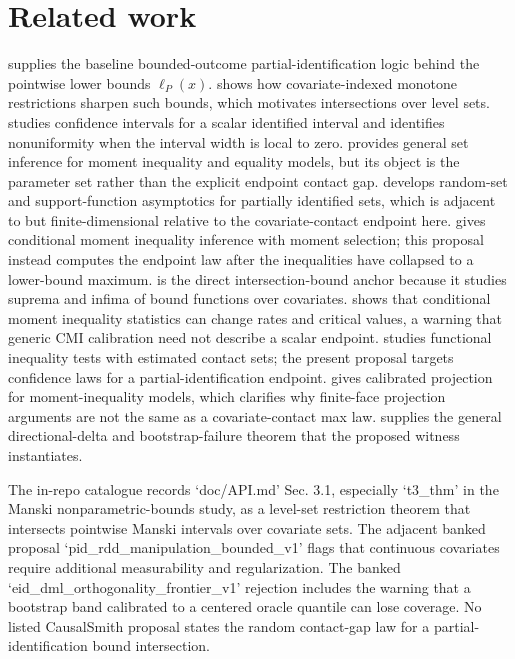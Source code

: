 \documentclass[11pt]{article}
\theoremstyle{definition}
\theoremstyle{plain}
\theoremstyle{remark}
\begin{document}
\section{Related work}
\citet{Manski1990} supplies the baseline bounded-outcome partial-identification logic behind the pointwise lower bounds \(\ell_P(x)\). \citet{ManskiPepper2000} shows how covariate-indexed monotone restrictions sharpen such bounds, which motivates intersections over level sets. \citet{ImbensManski2004} studies confidence intervals for a scalar identified interval and identifies nonuniformity when the interval width is local to zero. \citet{ChernozhukovHongTamer2007} provides general set inference for moment inequality and equality models, but its object is the parameter set rather than the explicit endpoint contact gap. \citet{BeresteanuMolinari2008} develops random-set and support-function asymptotics for partially identified sets, which is adjacent to but finite-dimensional relative to the covariate-contact endpoint here. \citet{AndrewsShi2013} gives conditional moment inequality inference with moment selection; this proposal instead computes the endpoint law after the inequalities have collapsed to a lower-bound maximum. \citet{ChernozhukovLeeRosen2013} is the direct intersection-bound anchor because it studies suprema and infima of bound functions over covariates. \citet{Armstrong2014} shows that conditional moment inequality statistics can change rates and critical values, a warning that generic CMI calibration need not describe a scalar endpoint. \citet{LeeSongWhang2018} studies functional inequality tests with estimated contact sets; the present proposal targets confidence laws for a partial-identification endpoint. \citet{KaidoMolinariStoye2019} gives calibrated projection for moment-inequality models, which clarifies why finite-face projection arguments are not the same as a covariate-contact max law. \citet{FangSantos2019} supplies the general directional-delta and bootstrap-failure theorem that the proposed witness instantiates.

The in-repo catalogue records `doc/API.md' Sec. 3.1, especially `t3_thm' in the Manski nonparametric-bounds study, as a level-set restriction theorem that intersects pointwise Manski intervals over covariate sets. The adjacent banked proposal `pid_rdd_manipulation_bounded_v1' flags that continuous covariates require additional measurability and regularization. The banked `eid_dml_orthogonality_frontier_v1' rejection includes the warning that a bootstrap band calibrated to a centered oracle quantile can lose coverage. No listed CausalSmith proposal states the random contact-gap law for a partial-identification bound intersection.
\end{document}
